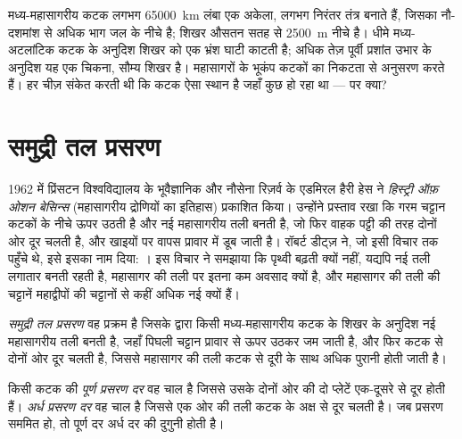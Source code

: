 मध्य-महासागरीय कटक लगभग
\qty{65000}{km} लंबा एक अकेला, लगभग निरंतर तंत्र बनाते हैं, जिसका नौ-दशमांश से अधिक भाग जल के नीचे है; शिखर
औसतन सतह से \qty{2500}{m} नीचे है। धीमे मध्य-अटलांटिक कटक के अनुदिश
शिखर को एक भ्रंश घाटी काटती है; अधिक तेज़ पूर्वी प्रशांत उभार के अनुदिश यह
एक चिकना, सौम्य शिखर है। महासागरों के भूकंप कटकों का
निकटता से अनुसरण करते हैं। हर चीज़ संकेत करती थी कि कटक ऐसा स्थान है
जहाँ कुछ हो रहा था --- पर क्या?

\section{समुद्री तल प्रसरण}

\begin{history}[हेस और वाहक पट्टी, 1962]
1962 में प्रिंसटन विश्वविद्यालय के भूवैज्ञानिक और नौसेना रिज़र्व के एडमिरल हैरी हेस
ने \emph{हिस्ट्री ऑफ़ ओशन बेसिन्स} (महासागरीय द्रोणियों का इतिहास) प्रकाशित किया।
उन्होंने प्रस्ताव रखा कि गरम चट्टान कटकों के नीचे ऊपर उठती है और नई महासागरीय तली बनती है,
जो फिर वाहक पट्टी की तरह दोनों ओर दूर चलती है, और खाइयों पर वापस
प्रावार में डूब जाती है। रॉबर्ट डीट्ज़ ने, जो इसी विचार तक पहुँचे थे, इसे
इसका नाम दिया: । इस विचार ने समझाया कि पृथ्वी बढ़ती क्यों नहीं,
यद्यपि नई तली लगातार बनती रहती है, महासागर की तली पर इतना कम अवसाद
क्यों है, और महासागर की तली की चट्टानें महाद्वीपों की चट्टानों से कहीं
अधिक नई क्यों हैं।
\end{history}

\begin{definition}[समुद्री तल प्रसरण]\label{def:g11:drift-to-spreading:spreading}
\emph{समुद्री तल प्रसरण} वह प्रक्रम है जिसके द्वारा
किसी मध्य-महासागरीय कटक के शिखर के अनुदिश नई महासागरीय तली बनती है, जहाँ पिघली चट्टान
प्रावार से ऊपर उठकर जम जाती है, और फिर कटक से दोनों ओर दूर
चलती है, जिससे महासागर की तली कटक से दूरी के साथ अधिक पुरानी होती जाती है।
\end{definition}

\begin{definition}[प्रसरण दर]\label{def:g11:drift-to-spreading:spreading-rate}
किसी कटक की \emph{पूर्ण प्रसरण दर} वह चाल है जिससे
उसके दोनों ओर की दो प्लेटें एक-दूसरे से दूर होती हैं। \emph{अर्ध प्रसरण
दर} वह चाल है जिससे एक ओर की तली कटक के
अक्ष से दूर चलती है। जब प्रसरण सममित हो, तो पूर्ण दर अर्ध दर की दुगुनी होती है।
\end{definition}

